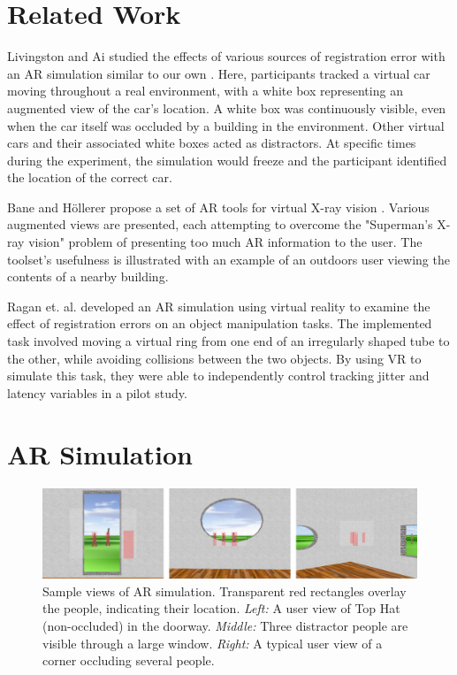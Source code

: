 \documentclass{acmsiggraph}                     %
\begin{document}
\section{Related Work}

Livingston and Ai studied the effects of various sources of registration error with an AR simulation similar to our own \cite{4637329}.  Here, participants tracked a virtual car moving throughout a real environment, with a white box representing an augmented view of the car's location.  A white box was continuously visible, even when the car itself was occluded by a building in the environment.  Other virtual cars and their associated white boxes acted as distractors.  At specific times during the experiment, the simulation would freeze and the participant identified the location of the correct car.

Bane and H\"{o}llerer propose a set of AR tools for virtual X-ray vision \cite{1383060}.  Various augmented views are presented, each attempting to overcome the "Superman's X-ray vision" problem of presenting too much AR information to the user.  The toolset's usefulness is illustrated with an example of an outdoors user viewing the contents of a nearby building.

Ragan et. al. \cite{4811058} developed an AR simulation using virtual reality to examine the effect of registration errors on an object manipulation tasks.  The implemented task involved moving a virtual ring from one end of an irregularly shaped tube to the other, while avoiding collisions between the two objects.  By using VR to simulate this task, they were able to independently control tracking jitter and latency variables in a pilot study.



\section{AR Simulation}

\begin{figure}[ht!]
	\centering
	\includegraphics[width=5in]{figures/triple_view.png}
	\caption{Sample views of AR simulation.  Transparent red rectangles overlay the people, indicating their location.  \emph{Left:} A user view of Top Hat (non-occluded) in the doorway.   \emph{Middle:} Three distractor people are visible through a large window.  \emph{Right:} A typical user view of a corner occluding several people.}
\end{figure}
\end{document}
